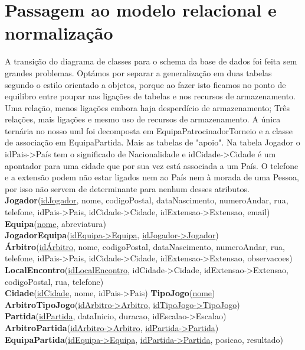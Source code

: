 \documentclass[a4paper]{article}
\begin{document}
\section{Passagem ao modelo relacional e normalização}
A transição do diagrama de classes para o schema da base de dados foi feita sem grandes problemas. Optámos por separar a generalização em duas tabelas segundo o estilo orientado a objetos, porque ao fazer isto ficamos no ponto de equilibro entre poupar nas ligações de tabelas e nos recursos de armazenamento. Uma relação, menos ligações embora haja desperdício de armazenamento; Três relações, mais ligações e mesmo uso de recursos de armazenamento. A única ternária no nosso uml foi decomposta em EquipaPatrocinadorTorneio e a classe de associação em EquipaPartida. Mais as tabelas de "apoio". Na tabela Jogador o idPais->País tem o significado de Nacionalidade e idCidade->Cidade é um apontador para uma cidade que por sua vez está associada a um País. O telefone e a extensão podem não estar ligados nem ao País nem à morada de uma Pessoa, por isso não servem de determinante para nenhum desses atributos.
\\\newline
\textbf{Jogador}(\underline{idJogador}, nome, codigoPostal, dataNascimento, numeroAndar, rua, telefone, idPais->Pais, idCidade->Cidade, idExtensao->Extensao, email) \\
\textbf{Equipa}(\underline{nome}, abreviatura) \\ %
\textbf{JogadorEquipa}(\underline{idEquipa->Equipa}, \underline{idJogador->Jogador}) \\
\textbf{Árbitro}(\underline{idÁrbitro}, nome, codigoPostal, dataNascimento, numeroAndar, rua, telefone, idPais->Pais, idCidade->Cidade, idExtensao->Extensao, observacoes) \\
\textbf{LocalEncontro}(\underline{idLocalEncontro}, idCidade->Cidade, idExtensao->Extensao, codigoPostal, rua, telefone) \\
\textbf{Cidade}(\underline{idCidade}, nome, idPais->Pais) \textbf{TipoJogo}(\underline{nome}) \\
\textbf{ArbitroTipoJogo}(\underline{idArbitro->Arbitro}, \underline{idTipoJogo->TipoJogo}) \\
\textbf{Partida}(\underline{idPartida}, dataInicio, duracao, idEscalao->Escalao) \\
\textbf{ArbitroPartida}(\underline{idArbitro->Arbitro}, \underline{idPartida->Partida}) \\
\textbf{EquipaPartida}(\underline{idEquipa->Equipa}, \underline{idPartida->Partida}, posicao, resultado) \\
\end{document}
